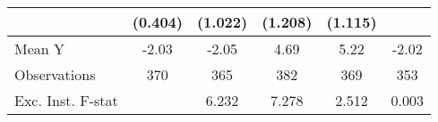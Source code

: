 {\begin{tabular}{l*{5}{c}}
            &     (0.404)         &     (1.022)         &     (1.208)         &     (1.115)         &                     \\
\midrule
Mean Y      &       -2.03         &       -2.05         &        4.69         &        5.22         &       -2.02         \\
Observations&         370         &         365         &         382         &         369         &         353         \\
Exc. Inst. F-stat&                     &       6.232         &       7.278         &       2.512         &       0.003         \\
\bottomrule
\end{tabular}
}
